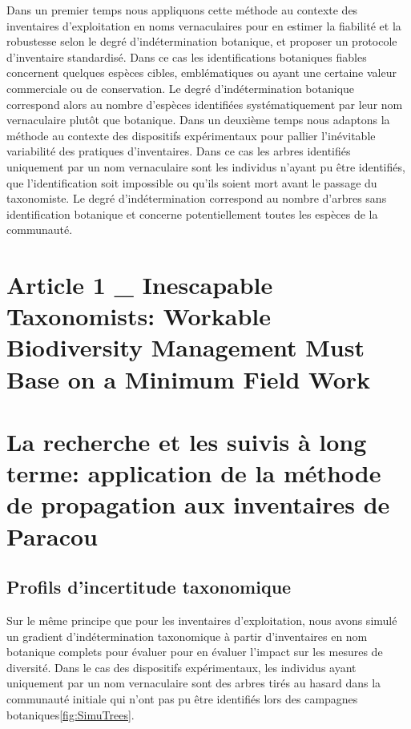 \documentclass[
  11pt,
  french,
  A4paper,
  extrafontsizes,onecolumn,openright
  ]{memoir}
\begin{document}
Dans un premier temps nous appliquons cette méthode au contexte des
inventaires d'exploitation en noms vernaculaires pour en estimer la
fiabilité et la robustesse selon le degré d'indétermination botanique,
et proposer un protocole d'inventaire standardisé. Dans ce cas les
identifications botaniques fiables concernent quelques espèces cibles,
emblématiques ou ayant une certaine valeur commerciale ou de
conservation. Le degré d'indétermination botanique correspond alors au
nombre d'espèces identifiées systématiquement par leur nom vernaculaire
plutôt que botanique. Dans un deuxième temps nous adaptons la méthode au
contexte des dispositifs expérimentaux pour pallier l'inévitable
variabilité des pratiques d'inventaires. Dans ce cas les arbres
identifiés uniquement par un nom vernaculaire sont les individus n'ayant
pu être identifiés, que l'identification soit impossible ou qu'ils
soient mort avant le passage du taxonomiste. Le degré d'indétermination
correspond au nombre d'arbres sans identification botanique et concerne
potentiellement toutes les espèces de la communauté.

\section{Article 1 \_ Inescapable Taxonomists: Workable Biodiversity
Management Must Base on a Minimum Field
Work}\label{article-1-_-inescapable-taxonomists-workable-biodiversity-management-must-base-on-a-minimum-field-work}

\section{La recherche et les suivis à long terme: application de la
méthode de propagation aux inventaires de
Paracou}\label{la-recherche-et-les-suivis-a-long-terme-application-de-la-methode-de-propagation-aux-inventaires-de-paracou}

\subsection{Profils d'incertitude
taxonomique}\label{profils-dincertitude-taxonomique}

Sur le même principe que pour les inventaires d'exploitation, nous avons
simulé un gradient d'indétermination taxonomique à partir d'inventaires
en nom botanique complets pour évaluer pour en évaluer l'impact sur les
mesures de diversité. Dans le cas des dispositifs expérimentaux, les
individus ayant uniquement par un nom vernaculaire sont des arbres tirés
au hasard dans la communauté initiale qui n'ont pas pu être identifiés
lors des campagnes botaniques\ref{fig:SimuTrees}.
\end{document}
